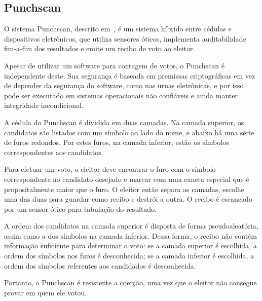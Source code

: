 \subsection{Punchscan}

O sistema Punchscan, descrito em~\cite{fisher2006punchscan}, é um sistema
híbrido entre cédulas e dispositivos eletrônicos, que utiliza sensores óticos,
implementa auditabilidade fim-a-fim dos resultados e emite um recibo de voto ao
eleitor.

Apesar de utilizar um software para contagem de votos, o Punchscan é
independente deste. Sua segurança é baseada em premissas criptográficas em vez
de depender da segurança do software, como nas urnas eletrônicas, e por isso
pode ser executado em sistemas operacionais não confiáveis e ainda manter
integridade incondicional.

A cédula do Punchscan é dividida em duas camadas. Na camada superior, os
candidatos são listados com um símbolo ao lado do nome, e abaixo há uma série
de furos redondos. Por estes furos, na camada inferior, estão os símbolos
correspondentes aos candidatos.

Para efetuar um voto, o eleitor deve encontrar o furo com o símbolo
correspondente ao candidato desejado e marcar com uma caneta especial que é
propositalmente maior que o furo. O eleitor então separa as camadas, escolhe
uma das duas para guardar como recibo e destrói a outra. O recibo é escaneado
por um sensor ótico para tabulação do resultado.

A ordem dos candidatos na camada superior é disposta de forma pseudoaleatória,
assim como a dos símbolos na camada inferior. Dessa forma, o recibo não contém
informação suficiente para determinar o voto: se a camada superior é escolhida,
a ordem dos símbolos nos furos é desconhecida; se a camada inferior é
escolhida, a ordem dos símbolos referentes aos candidados é desconhecida.

Portanto, o Punchscan é resistente a coerção, uma vez que o eleitor não
consegue provar em quem ele votou.
